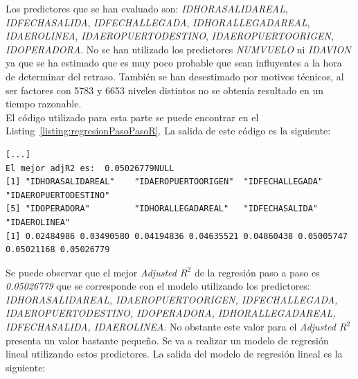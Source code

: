 \documentclass{article}
\begin{document}
Los predictores que se han evaluado son: \textit{IDHORASALIDAREAL}, \textit{IDFECHASALIDA}, \textit{IDFECHALLEGADA}, \textit{IDHORALLEGADAREAL}, \textit{IDAEROLINEA}, \textit{IDAEROPUERTODESTINO}, \textit{IDAEROPUERTOORIGEN}, \textit{IDOPERADORA}. No se han utilizado los predictores \textit{NUMVUELO} ni \textit{IDAVION} ya que se ha estimado que es muy poco probable que sean influyentes a la hora de determinar del retraso. También se han desestimado por motivos técnicos, al ser factores con 5783 y 6653 niveles distintos no se obtenía resultado en un tiempo razonable.\\

El código utilizado para esta parte se puede encontrar en el Listing~\ref{listing:regresionPasoPasoR}. La salida de este código es la siguiente: 

\begin{lstlisting}
[...]
El mejor adjR2 es:  0.05026779NULL
[1] "IDHORASALIDAREAL"    "IDAEROPUERTOORIGEN"  "IDFECHALLEGADA"      "IDAEROPUERTODESTINO"
[5] "IDOPERADORA"         "IDHORALLEGADAREAL"   "IDFECHASALIDA"       "IDAEROLINEA"        
[1] 0.02484986 0.03490580 0.04194836 0.04635521 0.04860438 0.05005747 0.05021168 0.05026779
\end{lstlisting}


Se puede observar que el mejor \textit{Adjusted $R^2$} de la regresión paso a paso es \textit{0.05026779} que se corresponde con el modelo utilizando los predictores: \textit{IDHORASALIDAREAL, IDAEROPUERTOORIGEN, IDFECHALLEGADA, IDAEROPUERTODESTINO, IDOPERADORA, IDHORALLEGADAREAL, IDFECHASALIDA, IDAEROLINEA}. No obstante este valor para el \textit{Adjusted $R^2$} presenta un valor bastante pequeño. Se va a realizar un modelo de regresión lineal utilizando estos predictores. La salida del modelo de regresión lineal es la siguiente:
\end{document}
